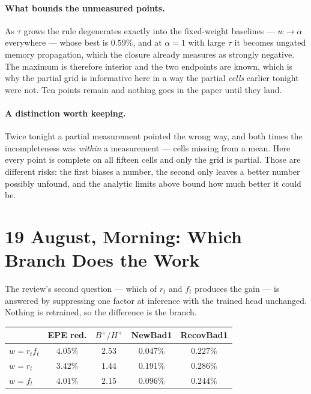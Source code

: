 \documentclass[11pt,a4paper]{article}
\begin{document}
\paragraph{What bounds the unmeasured points.} As $\tau$ grows the rule degenerates
exactly into the fixed-weight baselines --- $w \rightarrow \alpha$ everywhere ---
whose best is $0.59\%$, and at $\alpha{=}1$ with large $\tau$ it becomes ungated
memory propagation, which the closure already measures as strongly negative. The
maximum is therefore interior and the two endpoints are known, which is why the
partial grid is informative here in a way the partial \emph{cells} earlier tonight
were not. Ten points remain and nothing goes in the paper until they land.

\paragraph{A distinction worth keeping.} Twice tonight a partial measurement
pointed the wrong way, and both times the incompleteness was \emph{within} a
measurement --- cells missing from a mean. Here every point is complete on all
fifteen cells and only the grid is partial. Those are different risks: the first
biases a number, the second only leaves a better number possibly unfound, and the
analytic limits above bound how much better it could be.


\section*{19 August, Morning: Which Branch Does the Work}

The review's second question --- which of $r_t$ and $f_t$ produces the gain --- is
answered by suppressing one factor at inference with the trained head unchanged.
Nothing is retrained, so the difference is the branch.

\begin{center}
\begin{tabular}{lcccc}
\toprule
& EPE red. & $B^+/H^+$ & NewBad1 & RecovBad1 \\
\midrule
$w=r_tf_t$ & $4.05\%$ & $\mathbf{2.53}$ & $\mathbf{0.047\%}$ & $0.227\%$ \\
$w=r_t$    & $3.42\%$ & $1.44$ & $0.191\%$ & $0.286\%$ \\
$w=f_t$    & $4.01\%$ & $2.15$ & $0.096\%$ & $0.244\%$ \\
\bottomrule
\end{tabular}
\end{center}
\end{document}
